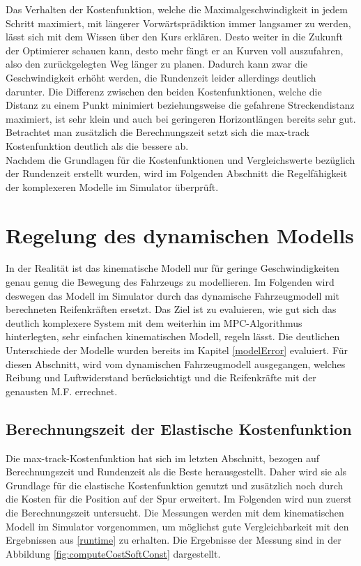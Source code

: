 \documentclass{like}
\begin{document}
Das Verhalten der Kostenfunktion, welche die Maximalgeschwindigkeit in jedem Schritt maximiert, mit längerer Vorwärtsprädiktion immer langsamer zu werden, lässt sich mit dem Wissen über den Kurs erklären. Desto weiter in die Zukunft der Optimierer schauen kann, desto mehr fängt er an  Kurven voll auszufahren, also den zurückgelegten Weg länger zu planen. Dadurch kann zwar die Geschwindigkeit erhöht werden, die Rundenzeit leider allerdings deutlich darunter. 
Die Differenz zwischen den beiden Kostenfunktionen, welche die Distanz zu einem Punkt minimiert beziehungsweise die gefahrene Streckendistanz maximiert, ist sehr klein und auch bei geringeren Horizontlängen bereits sehr gut. Betrachtet man zusätzlich die Berechnungszeit setzt sich die max-track Kostenfunktion deutlich als die bessere ab. \\
Nachdem die Grundlagen für die Kostenfunktionen und Vergleichswerte bezüglich der Rundenzeit erstellt wurden, wird im Folgenden Abschnitt die Regelfähigkeit der komplexeren Modelle im Simulator überprüft.

\section{Regelung des dynamischen Modells}
\label{dynModelcontrol}
In der Realität ist das kinematische Modell nur für geringe Geschwindigkeiten genau genug die Bewegung des Fahrzeugs zu modellieren. Im Folgenden wird deswegen das Modell im Simulator durch das dynamische Fahrzeugmodell mit berechneten Reifenkräften ersetzt. Das Ziel ist zu evaluieren, wie gut sich das deutlich komplexere System mit dem weiterhin im \ac{MPC}-Algorithmus hinterlegten, sehr einfachen kinematischen Modell, regeln lässt.
Die deutlichen Unterschiede der Modelle wurden bereits im Kapitel \ref{modelError} evaluiert. Für diesen Abschnitt, wird vom dynamischen Fahrzeugmodell ausgegangen, welches Reibung und Luftwiderstand berücksichtigt und die Reifenkräfte mit der genausten \ac{M.F.} errechnet.

\subsection{Berechnungszeit der Elastische Kostenfunktion}
Die max-track-Kostenfunktion hat sich im letzten Abschnitt, bezogen auf Berechnungszeit und Rundenzeit als die Beste herausgestellt. Daher wird sie als Grundlage für die elastische Kostenfunktion genutzt und zusätzlich noch durch die Kosten für die Position auf der Spur erweitert. Im Folgenden wird nun zuerst die Berechnungszeit untersucht. Die Messungen werden mit dem kinematischen Modell im Simulator vorgenommen, um möglichst gute Vergleichbarkeit mit den Ergebnissen aus \ref{runtime} zu erhalten. Die Ergebnisse der Messung sind in der Abbildung \ref{fig:computeCostSoftConst} dargestellt.
\end{document}
